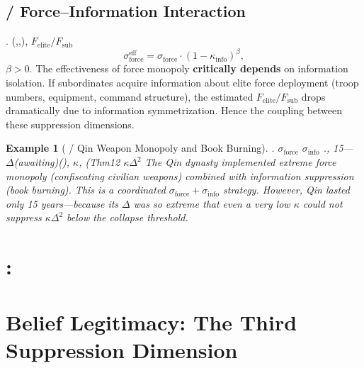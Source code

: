 \documentclass[11pt,a4paper]{article}
\newtheorem{example}[theorem]{Example}
\theoremstyle{definition}
\newcommand{\coupling}{\kappa}
\newcommand{\suppress}{\sigma}
\newcommand{\paren}[1]{\left(#1\right)}
\begin{document}
\subsection{ / Force--Information Interaction}
.
(,,), $F_{\text{elite}}/F_{\text{sub}}$ 
\[
\suppress_{\text{force}}^{\text{eff}} = \suppress_{\text{force}} \cdot
 \paren{1 - \coupling_{\text{info}}}^{\beta},
\]
 $\beta > 0$.
The effectiveness of force monopoly \textbf{critically depends} on information isolation.
If subordinates acquire information about elite force deployment (troop numbers, equipment,
command structure), the estimated $F_{\text{elite}}/F_{\text{sub}}$ drops dramatically
due to information symmetrization. Hence the coupling between these suppression dimensions.
\begin{example}[ / Qin Weapon Monopoly and Book Burning]
. $\suppress_{\text{force}}$ $\suppress_{\text{info}}$
., 15--- $\Delta$(awaiting)(), 
 $\coupling$, (Thm12 $\coupling \Delta^2$
The Qin dynasty implemented extreme force monopoly (confiscating civilian weapons)
combined with information suppression (book burning). This is a coordinated
$\suppress_{\text{force}} + \suppress_{\text{info}}$ strategy. However, Qin lasted
only 15 years---because its $\Delta$ was so extreme that even a very low $\coupling$
could not suppress $\coupling\Delta^2$ below the collapse threshold.
\end{example}
\section{:}
\section{Belief Legitimacy: The Third Suppression Dimension}
\end{document}
